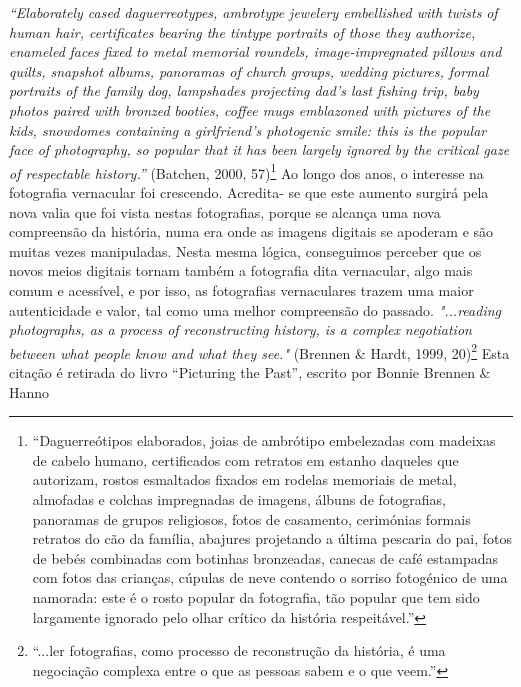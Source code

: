 \documentclass{article}
\begin{document}
\textit{“Elaborately cased daguerreotypes, ambrotype jewelery embellished with twists }
\textit{of human hair, certificates bearing the tintype portraits of those they authorize, enameled }
\textit{faces fixed to metal memorial roundels, image-impregnated pillows and quilts, snapshot }
\textit{albums, panoramas of church groups, wedding pictures, formal portraits of the family }
\textit{dog,  lampshades  projecting  dad’s  last  fishing  trip,  baby  photos  paired  with  bronzed }
\textit{booties,  coffee  mugs  emblazoned  with  pictures  of  the  kids,  snowdomes  containing  a }
\textit{girlfriend’s photogenic smile: this is the popular face of photography, so popular that it }
\textit{has been largely ignored by the critical gaze of respectable history.” }(Batchen, 2000, 57)\footnote{“Daguerreótipos elaborados, joias de ambrótipo embelezadas com madeixas de cabelo humano, certificados com retratos em estanho daqueles que autorizam, rostos esmaltados fixados em rodelas memoriais de metal, almofadas e colchas impregnadas de imagens, álbuns de fotografias, panoramas de grupos religiosos, fotos de casamento, cerimónias formais retratos do cão da família, abajures projetando a última pescaria do pai, fotos de bebés combinadas com botinhas bronzeadas, canecas de café estampadas com fotos das crianças, cúpulas de neve contendo o sorriso fotogénico de uma namorada: este é o rosto popular da fotografia, tão popular que tem sido largamente ignorado pelo olhar crítico da história respeitável.” }  
Ao longo dos anos, o interesse na fotografia vernacular foi crescendo. Acredita-
se que este aumento surgirá pela nova valia que foi vista nestas fotografias, porque se 
alcança  uma  nova  compreensão  da  história,  numa  era  onde  as  imagens  digitais  se 
apoderam e são muitas vezes manipuladas. Nesta mesma lógica, conseguimos perceber 
que  os  novos  meios  digitais  tornam  também  a  fotografia  dita  vernacular,  algo  mais 
comum  e  acessível,  e  por  isso,  as  fotografias  vernaculares  trazem  uma  maior 
autenticidade e valor, tal como uma melhor compreensão do passado. 
 \textit{"...reading  photographs,  as  a  process  of  reconstructing  history,  is  a  complex }
\textit{negotiation between what people know and what they see."} (Brennen \& Hardt, 1999, 20)\footnote{“...ler fotografias, como processo de reconstrução da história, é uma negociação complexa entre o que as pessoas sabem e o que veem.” } 
Esta citação é retirada do livro “Picturing the Past”, escrito por Bonnie Brennen \& Hanno 
 
\end{document}
